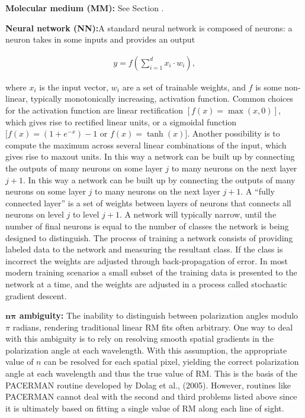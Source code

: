\documentclass[a4paper,10pt]{article}
\begin{document}
{\noindent}\textbf{Molecular medium (MM):} See Section \label{sec:ism}. 

{\noindent}\textbf{Neural network (NN):}A standard neural network is composed of neurons: a neuron takes in some inputs and provides an output

\begin{align*}
    y = f \left(\sum_{i=1}^dx_i\cdot w_i\right),
\end{align*}

{\noindent}where $x_i$ is the input vector, $w_i$ are a set of trainable weights, and $f$ is some non-linear, typically monotonically increasing, activation function. Common choices for the activation function are linear rectification $[f(x) = \max (x, 0)]$, which gives rise to rectified linear units, or a sigmoidal function $[f(x) = (1+e^{-x})-1$ or $f(x) = \tanh(x)]$. Another possibility is to compute the maximum across several linear combinations of the input, which gives rise to maxout units. In this way a network can be built up by connecting the outputs of many neurons on some layer $j$ to many neurons on the next layer $j+1$. In this way a network can be built up by connecting the outputs of many neurons on some layer $j$ to many neurons on the next layer $j+1$. A ``fully connected layer'' is a set of weights between layers of neurons that connects all neurons on level $j$ to level $j+1$. A network will typically narrow, until the number of final neurons is equal to the number of classes the network is being designed to distinguish. The process of training a network consists of providing labeled data to the network and measuring the resultant class. If the class is incorrect the weights are adjusted through back-propagation of error. In most modern training scenarios a small subset of the training data is presented to the network at a time, and the weights are adjusted in a process called stochastic gradient descent.

{\noindent}\textbf{$\mathbf{n\pi}$ ambiguity:} The inability to distinguish between polarization angles modulo $\pi$ radians, rendering traditional linear RM fits often arbitrary. One way to deal with this ambiguity is to rely on resolving smooth spatial gradients in the polarization angle at each wavelength. With this assumption, the appropriate value of $n$ can be resolved for each spatial pixel, yielding the correct polarization angle at each wavelength and thus the true value of RM. This is the basis of the PACERMAN routine developed by Dolag et al., (2005). However, routines like PACERMAN cannot deal with the second and third problems listed above since it is ultimately based on fitting a single value of RM along each line of sight. 
\end{document}
